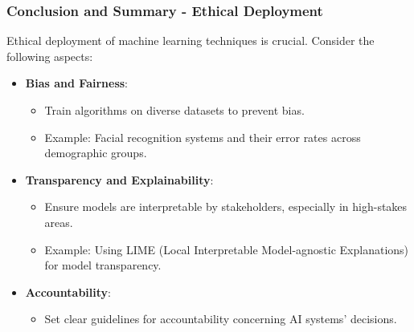 \documentclass[aspectratio=169]{beamer}
\begin{document}
\begin{frame}[fragile]
    \frametitle{Conclusion and Summary - Ethical Deployment}
    Ethical deployment of machine learning techniques is crucial. Consider the following aspects:
    \begin{itemize}
        \item \textbf{Bias and Fairness}: 
        \begin{itemize}
            \item Train algorithms on diverse datasets to prevent bias.
            \item Example: Facial recognition systems and their error rates across demographic groups.
        \end{itemize}
        
        \item \textbf{Transparency and Explainability}: 
        \begin{itemize}
            \item Ensure models are interpretable by stakeholders, especially in high-stakes areas.
            \item Example: Using LIME (Local Interpretable Model-agnostic Explanations) for model transparency.
        \end{itemize}
        
        \item \textbf{Accountability}: 
        \begin{itemize}
            \item Set clear guidelines for accountability concerning AI systems' decisions.
        \end{itemize}
    \end{itemize}
\end{frame}
\end{document}
